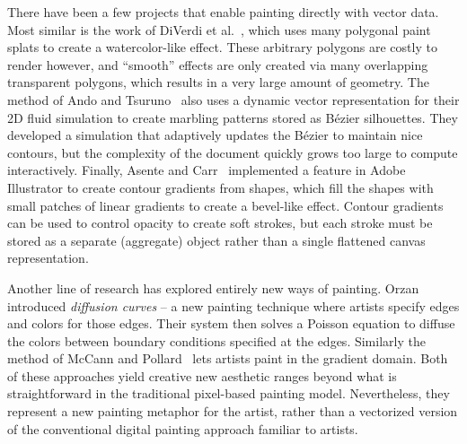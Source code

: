 \documentclass[conference]{acmsiggraph}
\begin{document}
There have been a few projects that enable painting directly with vector data.  Most similar is the work of DiVerdi et al.~, which uses many polygonal paint splats to create a watercolor-like effect.  These arbitrary polygons are costly to render however, and ``smooth'' effects are only created via many overlapping transparent polygons, which results in a very large amount of geometry. The method of Ando and Tsuruno~ also uses a dynamic vector representation for their 2D fluid simulation to create marbling patterns stored as B\'{e}zier silhouettes.  They developed a simulation that adaptively updates the B\'{e}zier to maintain nice contours, but the complexity of the document quickly grows too large to compute interactively.  Finally, Asente and Carr~ implemented a feature in Adobe Illustrator to create contour gradients from shapes, which fill the shapes with small patches of linear gradients to create a bevel-like effect.  Contour gradients can be used to control opacity to create soft strokes, but each stroke must be stored as a separate (aggregate) object rather than a single flattened canvas representation.

Another line of research has explored entirely new ways of painting.
Orzan~\etal~
introduced \emph{diffusion curves} --
a new painting technique where artists specify edges and colors for those edges. Their system
then solves a Poisson equation to diffuse the colors between boundary conditions specified at the edges.
Similarly the method of McCann and Pollard~
lets artists paint in the gradient domain. Both of these approaches yield creative new aesthetic ranges 
beyond what is straightforward in the traditional pixel-based painting model. Nevertheless,
they represent a new painting metaphor for the artist, rather than a vectorized version of the conventional
digital painting approach familiar to artists.
\end{document}
